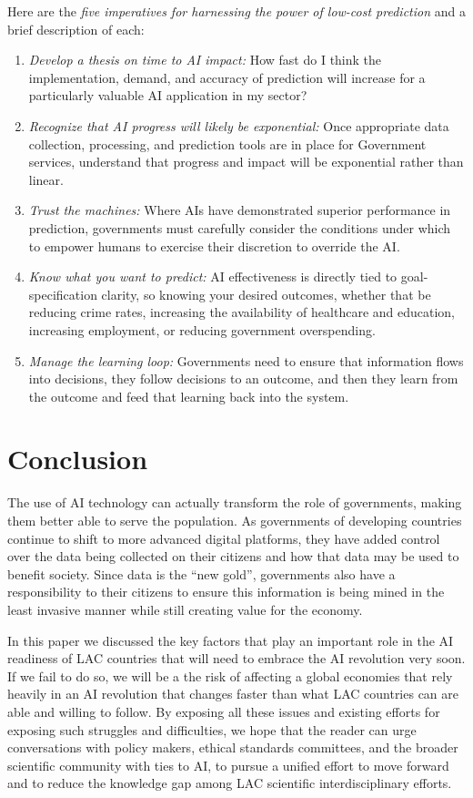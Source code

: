 \documentclass[conference]{IEEEtran}
\begin{document}
Here are the \emph{five imperatives for harnessing the power of low-cost prediction} and a brief description of each:
\begin{enumerate}
  \item \emph{Develop a thesis on time to AI impact:} How fast do I think the implementation, demand, and accuracy of prediction will increase for a particularly valuable AI application in my sector?
  \item \emph{Recognize that AI progress will likely be exponential:} Once appropriate data collection, processing, and prediction tools are in place for Government services, understand that progress and impact will be exponential rather than linear.
  \item \emph{Trust the machines:} Where AIs have demonstrated superior performance in prediction, governments must carefully consider the conditions under which to empower humans to exercise their discretion to override the AI.
  \item \emph{Know what you want to predict:} AI effectiveness is directly tied to goal-specification clarity, so knowing your desired outcomes, whether that be reducing crime rates, increasing the availability of healthcare and education, increasing employment, or reducing government overspending.
  \item \emph{Manage the learning loop:} Governments need to ensure that information flows into decisions, they follow decisions to an outcome, and then they learn from the outcome and feed that learning back into the system.
\end{enumerate}


\section{Conclusion}

The use of AI technology can actually transform the role of governments, making them better able to serve the population. As governments of developing countries continue to shift to more advanced digital platforms, they have added control over the data being collected on their citizens and how that data may be used to benefit society. Since data is the ``new gold'', governments also have a responsibility to their citizens to ensure this information is being mined in the least invasive manner while still creating value for the economy.

In this paper we discussed the key factors that play an important role in the AI readiness of LAC countries that will need to embrace the AI revolution very soon. If we fail to do so, we will be a the risk of affecting a global economies that rely heavily in an AI revolution that changes faster than what LAC countries can are able and willing to follow. By exposing all these issues and existing efforts for exposing such struggles and difficulties, we hope that the reader can urge conversations with policy makers, ethical standards committees, and the broader scientific community with ties to AI, to pursue a unified effort to move forward and to reduce the knowledge gap among LAC scientific interdisciplinary efforts.
\end{document}
